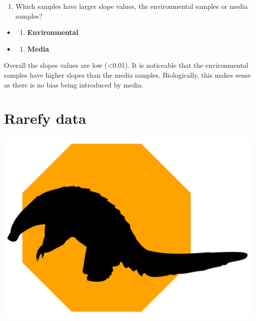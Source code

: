 \documentclass[
]{book}
\providecommand{\tightlist}{%
  \setlength{\itemsep}{0pt}\setlength{\parskip}{0pt}}
\begin{document}
\begin{enumerate}
\def\labelenumi{\arabic{enumi}.}
\setcounter{enumi}{2}
\tightlist
\item
  Which samples have larger slope values, the environmental samples or media samples?
\end{enumerate}

\begin{itemize}
\item
  \begin{enumerate}
  \def\labelenumi{(\Alph{enumi})}
  \tightlist
  \item
    \textbf{Environmental}\\
  \end{enumerate}
\item
  \begin{enumerate}
  \def\labelenumi{(\Alph{enumi})}
  \setcounter{enumi}{1}
  \tightlist
  \item
    \textbf{Media}
  \end{enumerate}
\end{itemize}

Overall the slopes values are low (\textless0.01).
It is noticeable that the environmental samples have higher slopes than the media samples.
Biologically, this makes sense as there is no bias being introduced by media.

\hypertarget{rarefy-data}{%
\section{Rarefy data}\label{rarefy-data}}

\includegraphics{figures/pangolin.png}
\end{document}
